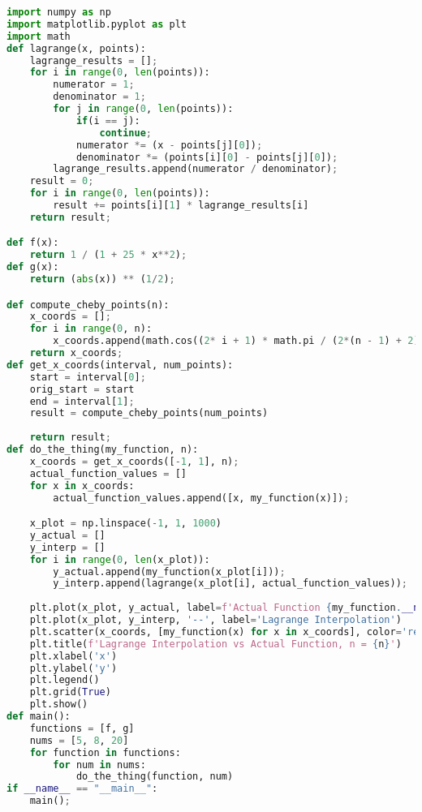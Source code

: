 \documentclass{article}
\begin{document}
\begin{lstlisting}[language=Python]
import numpy as np
import matplotlib.pyplot as plt
import math
def lagrange(x, points):
    lagrange_results = [];
    for i in range(0, len(points)):
        numerator = 1;
        denominator = 1;
        for j in range(0, len(points)):
            if(i == j):
                continue;
            numerator *= (x - points[j][0]);
            denominator *= (points[i][0] - points[j][0]);
        lagrange_results.append(numerator / denominator);
    result = 0;
    for i in range(0, len(points)):
        result += points[i][1] * lagrange_results[i]
    return result;

def f(x):
    return 1 / (1 + 25 * x**2);
def g(x):
    return (abs(x)) ** (1/2);

def compute_cheby_points(n):
    x_coords = [];
    for i in range(0, n):
        x_coords.append(math.cos((2* i + 1) * math.pi / (2*(n - 1) + 2)))
    return x_coords;
def get_x_coords(interval, num_points):
    start = interval[0];
    orig_start = start
    end = interval[1];
    result = compute_cheby_points(num_points)
    
    return result;
def do_the_thing(my_function, n):
    x_coords = get_x_coords([-1, 1], n);
    actual_function_values = []
    for x in x_coords:
        actual_function_values.append([x, my_function(x)]);

    x_plot = np.linspace(-1, 1, 1000)
    y_actual = []
    y_interp = []
    for i in range(0, len(x_plot)):
        y_actual.append(my_function(x_plot[i]));
        y_interp.append(lagrange(x_plot[i], actual_function_values));
    
    plt.plot(x_plot, y_actual, label=f'Actual Function {my_function.__name__}(x)')
    plt.plot(x_plot, y_interp, '--', label='Lagrange Interpolation')
    plt.scatter(x_coords, [my_function(x) for x in x_coords], color='red', label='Interpolation Nodes')
    plt.title(f'Lagrange Interpolation vs Actual Function, n = {n}')
    plt.xlabel('x')
    plt.ylabel('y')
    plt.legend()
    plt.grid(True)
    plt.show()
def main():
    functions = [f, g]
    nums = [5, 8, 20]
    for function in functions:
        for num in nums:
            do_the_thing(function, num)
if __name__ == "__main__":
    main();
\end{lstlisting}
\end{document}
